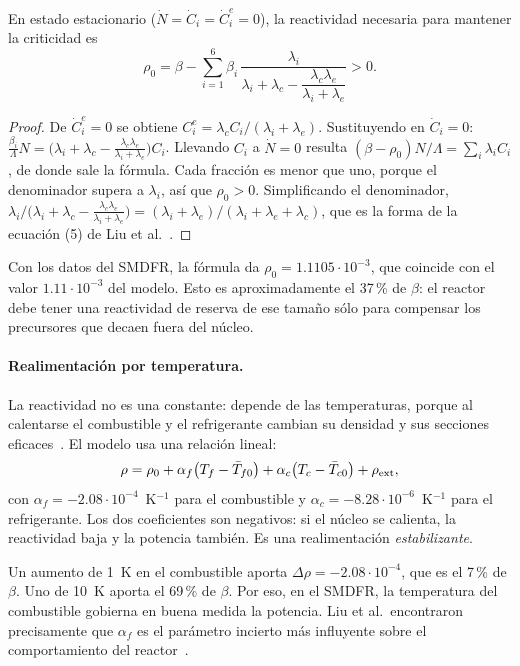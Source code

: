 \begin{proposicion}\label{prop:rho0}
En estado estacionario ($\dot N=\dot C_i=\dot C^e_i=0$), la reactividad necesaria para
mantener la criticidad es
\[
\rho_0=\beta-\sum_{i=1}^{6}\beta_i\,\frac{\lambda_i}{\lambda_i+\lambda_c-\dfrac{\lambda_c\lambda_e}{\lambda_i+\lambda_e}}>0 .
\]
\end{proposicion}
\begin{proof}
De $\dot C^e_i=0$ se obtiene $C^e_i=\lambda_cC_i/(\lambda_i+\lambda_e)$. Sustituyendo en
$\dot C_i=0$: $\tfrac{\beta_i}{\Lambda}N=\big(\lambda_i+\lambda_c-\tfrac{\lambda_c\lambda_e}{\lambda_i+\lambda_e}\big)C_i$.
Llevando $C_i$ a $\dot N=0$ resulta $(\beta-\rho_0)N/\Lambda=\sum_i\lambda_iC_i$, de donde sale
la fórmula. Cada fracción es menor que uno, porque el denominador supera a $\lambda_i$, así que
$\rho_0>0$. Simplificando el denominador,
$\lambda_i/\big(\lambda_i+\lambda_c-\tfrac{\lambda_c\lambda_e}{\lambda_i+\lambda_e}\big)
=(\lambda_i+\lambda_e)/(\lambda_i+\lambda_e+\lambda_c)$, que es la forma de la ecuación (5) de
Liu et al.~\cite{liu2021}.
\end{proof}
\noindent Con los datos del SMDFR, la fórmula da $\rho_0=1.1105\cdot10^{-3}$, que coincide con
el valor $1.11\cdot10^{-3}$ del modelo. Esto es aproximadamente el 37\,\% de $\beta$: el
reactor debe tener una reactividad de reserva de ese tamaño sólo para compensar los
precursores que decaen fuera del núcleo.

\paragraph{Realimentación por temperatura.} La reactividad no es una constante: depende de las
temperaturas, porque al calentarse el combustible y el refrigerante cambian su densidad y sus
secciones eficaces~\cite{duderstadt1976}. El modelo usa una relación lineal:
\[
\rho=\rho_0+\alpha_f\big(T_f-\bar T_{f0}\big)+\alpha_c\big(T_c-\bar T_{c0}\big)+\rho_{\rm ext},
\]
con $\alpha_f=-2.08\cdot10^{-4}$~K$^{-1}$ para el combustible y
$\alpha_c=-8.28\cdot10^{-6}$~K$^{-1}$ para el refrigerante. Los dos coeficientes son negativos:
si el núcleo se calienta, la reactividad baja y la potencia también. Es una realimentación
\emph{estabilizante}.

\begin{ejemplo}
Un aumento de 1~K en el combustible aporta $\Delta\rho=-2.08\cdot10^{-4}$, que es el 7\,\% de
$\beta$. Uno de 10~K aporta el 69\,\% de $\beta$. Por eso, en el SMDFR, la temperatura del
combustible gobierna en buena medida la potencia. Liu et al.\ encontraron precisamente que
$\alpha_f$ es el parámetro incierto más influyente sobre el comportamiento del
reactor~\cite{liu2021}.
\end{ejemplo}


